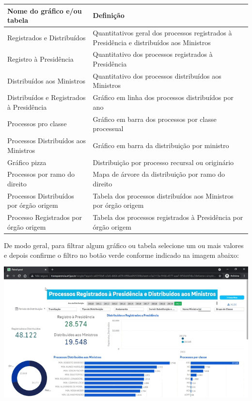 \documentclass[
]{book}
\begin{document}
\begin{tabular}{l|l}
\hline
Nome do gráfico e/ou tabela & Definição\\
\hline
Registrados e Distribuídos & Quantitativos geral dos processos registrados à Presidência e distribuídos aos Ministros\\
\hline
Registro à Presidência & Quantitativo dos processos registrados à Presidência\\
\hline
Distribuídos aos Ministros & Quantitativo dos processos distribuídos aos Ministros\\
\hline
Distribuídos e Registrados à Presidência & Gráfico em linha dos processos distribuídos por ano\\
\hline
Processos pro classe & Gráfico em barra dos processos por classe processual\\
\hline
Processos Distribuídos aos Ministros & Gráfico em barra da distribuição por ministro\\
\hline
Gráfico pizza & Distribuição por processo recursal ou originário\\
\hline
Processos por ramo do direito & Mapa de árvore da distribuição por ramo do direito\\
\hline
Processos Distribuídos por órgão origem & Tabela dos processos distribuídos aos Ministros por órgão origem\\
\hline
Processo Registrados por órgão origem & Tabela dos processos registrados à Presidência por órgão origem\\
\hline
\end{tabular}

De modo geral, para filtrar algum gráfico ou tabela selecione um ou mais valores e depois confirme o filtro no botão verde conforme indicado na imagem abaixo:

\includegraphics[width=1\linewidth]{imagens/fig-cap6-3}
\end{document}

